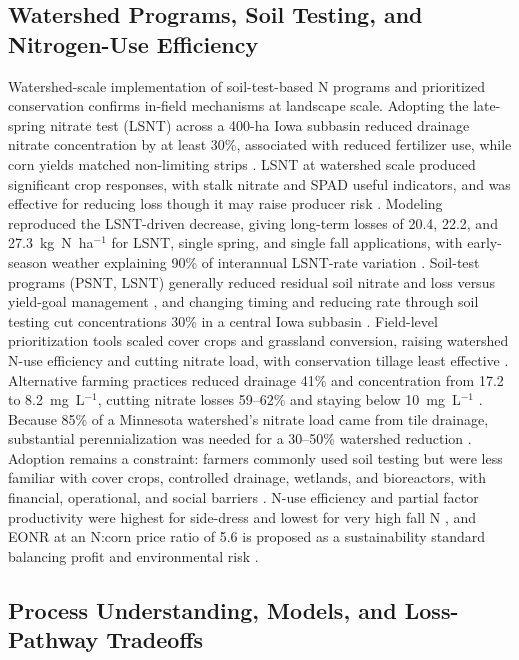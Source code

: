 \documentclass[11pt]{article}
\begin{document}
\subsection{Watershed Programs, Soil Testing, and Nitrogen-Use Efficiency}

Watershed-scale implementation of soil-test-based N programs and prioritized conservation confirms in-field mechanisms at landscape scale. Adopting the late-spring nitrate test (LSNT) across a 400-ha Iowa subbasin reduced drainage nitrate concentration by at least 30\%, associated with reduced fertilizer use, while corn yields matched non-limiting strips \parencite{Jaynes2004}. LSNT at watershed scale produced significant crop responses, with stalk nitrate and SPAD useful indicators, and was effective for reducing loss though it may raise producer risk \parencite{Karlen2005}. Modeling reproduced the LSNT-driven decrease, giving long-term losses of 20.4, 22.2, and 27.3~kg~N~ha$^{-1}$ for LSNT, single spring, and single fall applications, with early-season weather explaining 90\% of interannual LSNT-rate variation \parencite{Malone2010}. Soil-test programs (PSNT, LSNT) generally reduced residual soil nitrate and loss versus yield-goal management \parencite{Dinnes2002}, and changing timing and reducing rate through soil testing cut concentrations 30\% in a central Iowa subbasin \parencite{Ritter2015}. Field-level prioritization tools scaled cover crops and grassland conversion, raising watershed N-use efficiency and cutting nitrate load, with conservation tillage least effective \parencite{Makhtoumi2025}. Alternative farming practices reduced drainage 41\% and concentration from 17.2 to 8.2~mg~L$^{-1}$, cutting nitrate losses 59--62\% and staying below 10~mg~L$^{-1}$ \parencite{Oquist2007}. Because 85\% of a Minnesota watershed's nitrate load came from tile drainage, substantial perennialization was needed for a 30--50\% watershed reduction \parencite{Wilson2023}. Adoption remains a constraint: farmers commonly used soil testing but were less familiar with cover crops, controlled drainage, wetlands, and bioreactors, with financial, operational, and social barriers \parencite{David2015}. N-use efficiency and partial factor productivity were highest for side-dress and lowest for very high fall N \parencite{Jaynes2015}, and EONR at an N:corn price ratio of 5.6 is proposed as a sustainability standard balancing profit and environmental risk \parencite{Bandura2025}.

\subsection{Process Understanding, Models, and Loss-Pathway Tradeoffs}
\end{document}
